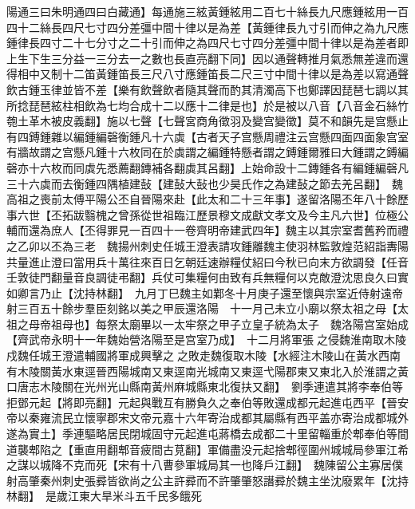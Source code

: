 陽通三曰朱明通四曰白藏通】每通施三絃黃鍾絃用二百七十絲長九尺應鍾絃用一百四十二絲長四尺七寸四分差彊中間十律以是為差【黃鍾律長九寸引而伸之為九尺應鍾律長四寸二十七分寸之二十引而伸之為四尺七寸四分差彊中間十律以是為差者即上生下生三分益一三分去一之數也長直亮翻下同】因以通聲轉推月氣悉無差違而還得相中又制十二笛黃鍾笛長三尺八寸應鍾笛長二尺三寸中間十律以是為差以寫通聲飲古鍾玉律並皆不差【樂有飲聲飲者隨其聲而酌其清濁高下也鄭譯因琵琶七調以其所捻琵琶絃柱相飲為七均合成十二以應十二律是也】於是被以八音【八音金石絲竹匏土革木被皮義翻】施以七聲【七聲宮商角徵羽及變宫變徵】莫不和韻先是宫懸止有四鎛鍾雜以編鍾編磬衡鍾凡十六虡【古者天子宫懸周禮注云宫懸四面四面象宫室有牆故謂之宫懸凡鍾十六枚同在於虡謂之編鍾特懸者謂之鎛鍾爾雅曰大鍾謂之鎛編磬亦十六枚而同虡先悉薦翻鏄補各翻虡其呂翻】上始命設十二鏄鍾各有編鍾編磬凡三十六虡而去衡鍾四隅植建鼔【建鼔大鼔也少昊氏作之為建鼔之節去羌呂翻】　魏高祖之喪前太傅平陽公丕自晉陽來赴【此太和二十三年事】遂留洛陽丕年八十餘歷事六世【丕拓跋翳槐之曾孫從世祖臨江歷景穆文成獻文孝文及今主凡六世】位極公輔而還為庶人【丕得罪見一百四十一卷齊明帝建武四年】魏主以其宗室耆舊矜而禮之乙卯以丕為三老　魏揚州刺史任城王澄表請攻鍾離魏主使羽林監敦煌范紹詣夀陽共量進止澄曰當用兵十萬往來百日乞朝廷速辦糧仗紹曰今秋已向末方欲調發【任音壬敦徒門翻量音良調徒弔翻】兵仗可集糧何由致有兵無糧何以克敵澄沈思良久曰實如卿言乃止【沈持林翻】　九月丁巳魏主如鄴冬十月庚子還至懷與宗室近侍射遠帝射三百五十餘步羣臣刻銘以美之甲辰還洛陽　十一月己未立小廟以祭太祖之母【太祖之母帝祖母也】每祭太廟畢以一太牢祭之甲子立皇子統為太子　魏洛陽宫室始成【齊武帝永明十一年魏始營洛陽至是宫室乃成】　十二月將軍張之侵魏淮南取木陵戍魏任城王澄遣輔國將軍成興擊之之敗走魏復取木陵【水經注木陵山在黃水西南有木陵關黃水東逕晉西陽城南又東逕南光城南又東逕弋陽郡東又東北入於淮謂之黃口唐志木陵關在光州光山縣南黃州麻城縣東北復扶又翻】　劉季連遣其將李奉伯等拒鄧元起【將即亮翻】元起與戰互有勝負久之奉伯等敗還成都元起進屯西平【晉安帝以秦雍流民立懷寧郡宋文帝元嘉十六年寄治成都其屬縣有西平盖亦寄治成都城外遂為實土】季連驅略居民閉城固守元起進屯蔣橋去成都二十里留輜重於郫奉伯等間道襲郫陷之【重直用翻郫音疲間古莧翻】軍備盡没元起捨郫徑圍州城城局參軍江希之謀以城降不克而死【宋有十八曹參軍城局其一也降戶江翻】　魏陳留公主寡居僕射高肇秦州刺史張彛皆欲尚之公主許彛而不許肇肇怒譖彛於魏主坐沈廢累年【沈持林翻】　是歲江東大旱米斗五千民多餓死

